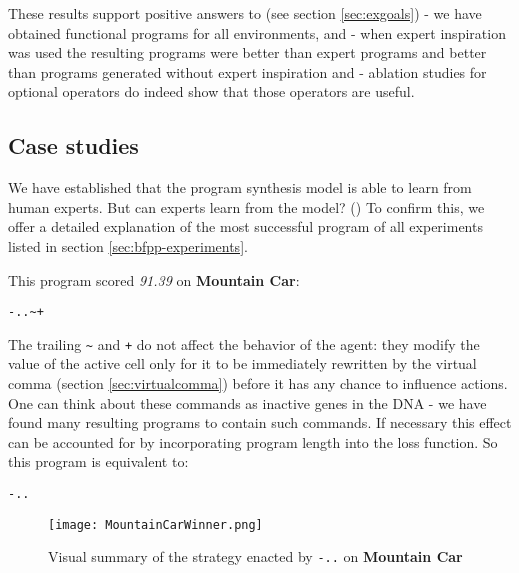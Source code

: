 These results support positive answers to (see section \ref{sec:exgoals}) \rqbfpp{} - we have obtained functional programs for all environments, and \rqbfppexpert{} - when expert inspiration was used the resulting programs were better than expert programs and better than programs generated without expert inspiration and \rqbfppablation - ablation studies for optional operators do indeed show that those operators are useful.

\subsection{Case studies}
\label{sec:casestudies}

We have established that the program synthesis model is able to learn from human experts.
But can experts learn from the model? (\rqbfppexplainable{}) 
To confirm this, we offer a detailed explanation of the most successful program of all experiments listed in section \ref{sec:bfpp-experiments}.

This program scored \emph{91.39} on \textbf{Mountain Car}:

\begin{center}
\begin{lstlisting}
-..~+
\end{lstlisting}
\end{center}

The trailing \verb|~| and \verb|+| do not affect the behavior of the agent: they modify the value of the active cell only for it to be immediately rewritten by the virtual comma (section \ref{sec:virtualcomma}) before it has any chance to influence actions.
One can think about these commands as inactive genes in the DNA - we have found many resulting programs to contain such commands.
If necessary this effect can be accounted for by incorporating program length into the loss function.
So this program is equivalent to:

\begin{center}
\begin{lstlisting}
-..
\end{lstlisting}
\end{center}

\begin{figure}
    \centering
    \texttt{[image: MountainCarWinner.png]}
    \caption{Visual summary of the strategy enacted by \texttt{-..} on \textbf{Mountain Car}}
    \label{fig:mountaincarwinner}
\end{figure}

